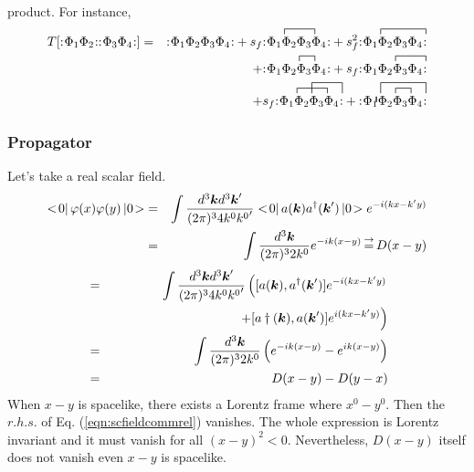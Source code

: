 product.
For instance, 
\begin{eqnarray}
T[\normalprod{\Phi_1 \Phi_2} \normalprod{\Phi_3 \Phi_4} ]
&=&
\normalprod{\Phi_1 \Phi_2 \Phi_3 \Phi_4}
+
s_f \normalprod{
\acontraction[1ex]{}{\Phi}{{}_1 \Phi_2}{\Phi}
\Phi_1 \Phi_2 \Phi_3 \Phi_4}
+
s_f^2 
\normalprod{
\acontraction[1ex]{}{\Phi}{{}_1 \Phi_2 \Phi_3}{\Phi}
\Phi_1 \Phi_2 \Phi_3 \Phi_4}
\nonumber\\
&&+
\normalprod{\acontraction[1ex]{\Phi_1 }{\Phi}{{}_2}{\Phi}\Phi_1 \Phi_2 \Phi_3 \Phi_4}
+
s_f
\normalprod{\acontraction[1ex]{\Phi_1 }{\Phi}{{}_2 \Phi_3}{\Phi}\Phi_1 \Phi_2 \Phi_3 \Phi_4}
\nonumber\\
&&
+
s_f
\normalprod{
\acontraction[1ex]{}{\Phi}{{}_1 \Phi_2}{\Phi}
\acontraction[2ex]{\Phi_1}{\Phi}{{}_2 \Phi_3}{\Phi}
\Phi_1 \Phi_2 \Phi_3 \Phi_4}
+
\normalprod{\acontraction[1ex]{}{}{}{}
\acontraction[2ex]{}{\Phi}{{}_1 \Phi_2 \Phi_3}{\Phi}
\acontraction[1ex]{\Phi_1}{\Phi}{{}_2}{\Phi}
\Phi_1 \Phi_2 \Phi_3 \Phi_4}
\label{eqn:TofNormals}
\end{eqnarray}


\newpage

\subsubsection{Propagator}
Let's take a real scalar field.
\begin{eqnarray}
<\! 0 |\, \varphi(x) \varphi(y) \,| 0 \!>
&=&
\int \frac{d^3 \mbox{\boldmath $k$} d^3 \mbox{\boldmath $k$}'}{(2\pi)^3 4 k^0 {k^0}'} 
<\! 0 |\, a(\mbox{\boldmath $k$}) a^\dagger(\mbox{\boldmath $k$}') \,| 0 \!>
e^{-i(kx - k'y)}
\nonumber\\
&=&
\int \frac{d^3 \mbox{\boldmath $k$} }{(2\pi)^3 2 k^0} 
e^{-ik(x - y)}
\,\mbox{$\stackrel{\rightarrow}{=}$}\,
D(x-y)
\end{eqnarray}
\begin{eqnarray}
[\varphi(x), \varphi(y)]
&=&
\int \frac{d^3 \bld{k} d^3 \bld{k}'}{(2\pi)^3 4 k^0 {k^0}'} 
\left(
[a(\bld{k}), a^\dagger(\bld{k}')]e^{-i(kx - k'y)}
\right.
\nonumber\\
&&
\left.
\hspace{35mm}
+
[a\dagger(\bld{k}), a(\bld{k}')]e^{i(kx - k'y)}
\right)
\nonumber\\
&=&
\int \frac{d^3 \bld{k} }{(2\pi)^3 2 k^0} 
\left(
e^{-ik(x - y)} - e^{ik(x - y)}
\right)
\nonumber\\
&=&
D(x-y) - D(y-x)
\label{eqn:scfieldcommrel}
\end{eqnarray}
When $x-y$ is spacelike, there exists a Lorentz frame where $x^0 - y^0$.
Then the $r.h.s.$ of Eq. (\ref{eqn:scfieldcommrel}) vanishes. 
The whole expression is Lorentz invariant and it must vanish for all $(x-y)^2 < 0$.
Nevertheless, $D(x-y)$ itself does not vanish even $x-y$ is spacelike.

